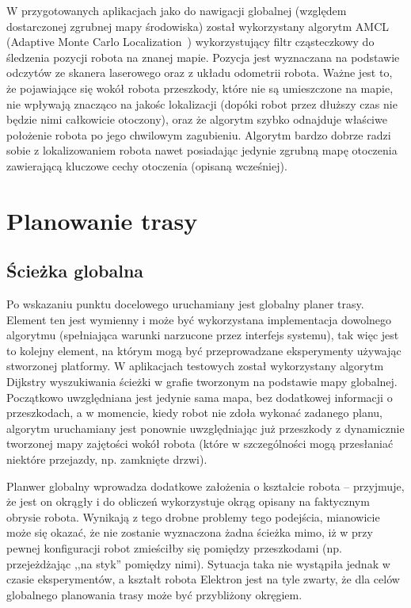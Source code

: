 W przygotowanych aplikacjach jako do nawigacji globalnej (względem dostarczonej
zgrubnej mapy środowiska) został wykorzystany algorytm AMCL (Adaptive Monte Carlo
Localization~\cite{fox2001kld}) wykorzystujący filtr cząsteczkowy do śledzenia
pozycji robota na znanej mapie. Pozycja jest wyznaczana na podstawie odczytów
ze skanera laserowego oraz z układu odometrii robota. Ważne jest to, że pojawiające
się wokół robota przeszkody, które nie są umieszczone na mapie, nie wpływają znacząco
na jakośc lokalizacji (dopóki robot przez dłuższy czas nie będzie nimi całkowicie
otoczony), oraz że algorytm szybko odnajduje właściwe położenie robota po jego
chwilowym zagubieniu. Algorytm bardzo dobrze radzi sobie z lokalizowaniem robota nawet
posiadając jedynie zgrubną mapę otoczenia zawierającą kluczowe cechy otoczenia
(opisaną wcześniej).

\section{Planowanie trasy}

\subsection{Ścieżka globalna}

Po wskazaniu punktu docelowego uruchamiany jest globalny planer trasy. Element ten
jest wymienny i może być wykorzystana implementacja dowolnego algorytmu (spełniająca
warunki narzucone przez interfejs systemu), tak więc jest to kolejny element, na którym
mogą być przeprowadzane eksperymenty używając stworzonej platformy. W aplikacjach
testowych został wykorzystany algorytm Dijkstry wyszukiwania ścieżki w grafie tworzonym
na podstawie mapy globalnej. Początkowo uwzględniana jest jedynie sama mapa, bez
dodatkowej informacji o przeszkodach, a w momencie, kiedy robot nie zdoła wykonać
zadanego planu, algorytm uruchamiany jest ponownie uwzględniając już przeszkody
z dynamicznie tworzonej mapy zajętości wokół robota (które w szczególności mogą
przesłaniać niektóre przejazdy, np. zamknięte drzwi).

Planwer globalny wprowadza dodatkowe założenia o kształcie robota -- przyjmuje, że
jest on okrągły i do obliczeń wykorzystuje okrąg opisany na faktycznym obrysie robota.
Wynikają z tego drobne problemy tego podejścia, mianowicie może się okazać, że nie
zostanie wyznaczona żadna ścieżka mimo, iż w przy pewnej konfiguracji robot zmieściłby
się pomiędzy przeszkodami (np. przejeżdżając ,,na styk'' pomiędzy nimi). Sytuacja
taka nie wystąpiła jednak w czasie eksperymentów, a kształt robota Elektron jest
na tyle zwarty, że dla celów globalnego planowania trasy może być przybliżony okręgiem.

